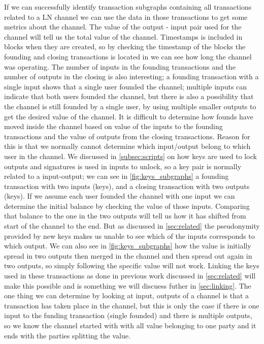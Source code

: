 If we can successfully identify transaction subgraphs containing all transactions related to a LN channel we can use the data in those transactions to get some metrics about the channel. The value of the output - input pair used for the channel will tell us the total value of the channel. Timestamps is included in blocks when they are created, so by checking the timestamp of the blocks the founding and closing transactions is located in we can see how long the channel was operating. The number of inputs in the founding transactions and the number of outputs in the closing is also interesting; a founding transaction with a single input shows that a single user founded the channel; multiple inputs can indicate that both users founded the channel, but there is also a possibility that the channel is still founded by a single user, by using multiple smaller outputs to get the desired value of the channel. It is difficult to determine how founds have moved inside the channel based on value of the inputs to the founding transactions and the value of outputs from the closing transactions. Reason for this is that we normally cannot determine which input/output belong to which user in the channel. We discussed in \cref{subsec:scripts} on how keys are used to lock outputs and signatures is used in inputs to unlock, so a key pair is normally related to a input-output; we can see in \cref{fig:keys_subgraphs} a founding transaction with two inputs (keys), and a closing transaction with two outputs (keys). If we assume each user founded the channel with one input we can determine the initial balance by checking the value of those inputs. Comparing that balance to the one in the two outputs will tell us how it has shifted from start of the channel to the end. But as discussed in \cref{sec:related} the pseudonymity provided by new keys makes us unable to see which of the inputs corresponds to which output. We can also see in \cref{fig:keys_subgraphs} how the value is initially spread in two outputs then merged in the channel and then spread out again in two outputs, so simply following the specific value will not work. Linking the keys used in these transactions as done in previous work discussed in \cref{sec:related} will make this possible and is something we will discuess futher in \cref{sec:linking}. The one thing we can determine by looking at input, outputs of a channel is that a transaction has taken place in the channel, but this is only the case if there is one input to the funding transaction (single founded) and there is multiple outputs, so we know the channel started with with all value belonging to one party and it ends with the parties splitting the value.

